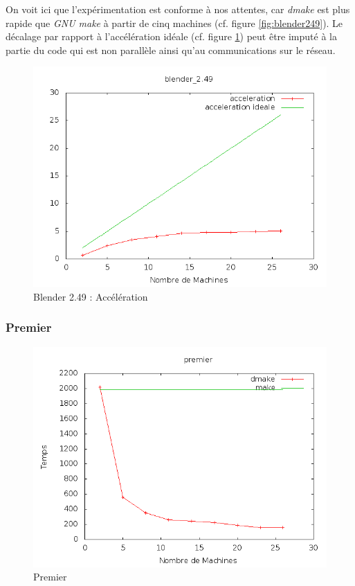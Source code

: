 \documentclass[a4paper,12pt,twoside]{article}
\begin{document}
On voit ici que l'expérimentation est conforme à nos attentes, car \emph{dmake} est plus rapide que \emph{GNU make} à  partir de cinq machines (cf. figure \ref{fig:blender249}). Le décalage par rapport à l'accélération idéale (cf. figure \ref{fig:blender249acc}) peut
être imputé à la partie du code qui est non parallèle ainsi qu'au communications sur le réseau. 

\begin{figure}[h]
  \centering
  \includegraphics[scale=0.5]{acceleration_blender_2_49.png}
  \caption{Blender 2.49 : Accélération}
  \label{fig:blender249acc}
\end{figure}


\subsubsection{Premier}


\begin{figure}[h]
  \centering
  \includegraphics[scale=0.5]{graph_premier.png}
  \caption{Premier}
  \label{fig:premier}
\end{figure}
\end{document}
